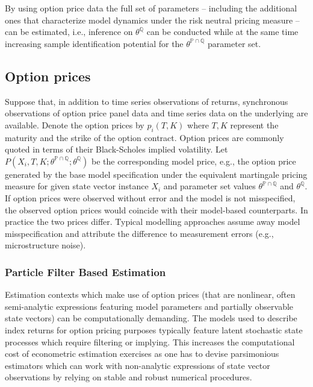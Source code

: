 \documentclass[11pt,a4paper,notitlepage]{article}
\numberwithin{equation}{section}
\begin{document}
By using option price data the full set of parameters -- including the additional ones that characterize model dynamics under the risk neutral pricing measure -- can be estimated, i.e., inference on $\theta^\mathbb{Q}$ can be conducted while at the same time increasing sample identification potential for the $\theta^{\mathbb{P} \cap \mathbb{Q}}$ parameter set. 

\subsection{Option prices}
Suppose that, in addition to time series observations of returns, synchronous observations of option price panel data and time series data on the underlying are available. Denote the option prices by $p_{i}(T,K)$ where $T,K$ represent the maturity and the strike of the option contract. Option prices are commonly quoted in terms of their Black-Scholes implied volatility. Let $P(X_{i},T,K; \theta^{\mathbb{P}\cap\mathbb{Q}}; \theta^\mathbb{Q})$ be the corresponding model price, e.g., the option price generated by the base model specification under the equivalent martingale pricing measure for  given state vector instance $X_{i}$ and parameter set values $\theta^{\mathbb{P}\cap\mathbb{Q}}$ and $\theta^\mathbb{Q}$. If option prices were observed without error and the model is not misspecified, the observed option prices would coincide with their model-based counterparts. In practice the two prices differ. Typical modelling approaches assume away model misspecification and attribute the difference to measurement errors (e.g., microstructure noise). 

\subsubsection{Particle Filter Based Estimation}
Estimation contexts which make use of option prices (that are nonlinear, often semi-analytic expressions featuring model parameters and partially observable state vectors) can be computationally demanding. The models used to describe index returns for option pricing purposes typically feature latent stochastic state processes which require filtering  or implying. This increases the computational cost of econometric estimation exercises as one has to devise parsimonious estimators which can work with non-analytic expressions of state vector observations by relying on stable and robust numerical procedures. 

\end{document}
